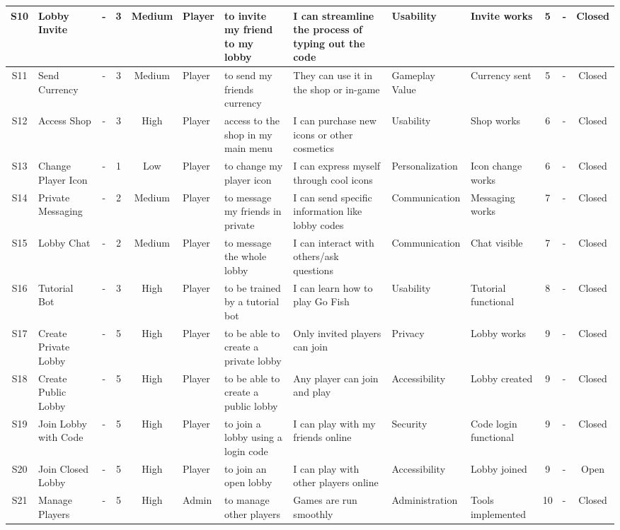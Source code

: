 \documentclass[12pt]{article}
\begin{document}
\begin{table}[H]
{\begin{tabular}{|c|p{2.5cm}|c|c|c|p{3cm}|p{3cm}|p{3cm}|p{3cm}|p{2.5cm}|c|p{2.5cm}|c|}
S10 & Lobby Invite & - & 3 & Medium & Player & to invite my friend to my lobby & I can streamline the process of typing out the code & Usability & Invite works & 5 & - & Closed \\ \hline
S11 & Send Currency & - & 3 & Medium & Player & to send my friends currency & They can use it in the shop or in-game & Gameplay Value & Currency sent & 5 & - & Closed \\ \hline
S12 & Access Shop & - & 3 & High & Player & access to the shop in my main menu & I can purchase new icons or other cosmetics & Usability & Shop works & 6 & - & Closed \\ \hline
S13 & Change Player Icon & - & 1 & Low & Player & to change my player icon & I can express myself through cool icons & Personalization & Icon change works & 6 & - & Closed \\ \hline
S14 & Private Messaging & - & 2 & Medium & Player & to message my friends in private & I can send specific information like lobby codes & Communication & Messaging works & 7 & - & Closed \\ \hline
S15 & Lobby Chat & - & 2 & Medium & Player & to message the whole lobby & I can interact with others/ask questions & Communication & Chat visible & 7 & - & Closed \\ \hline
S16 & Tutorial Bot & - & 3 & High & Player & to be trained by a tutorial bot & I can learn how to play Go Fish & Usability & Tutorial functional & 8 & - & Closed \\ \hline
S17 & Create Private Lobby & - & 5 & High & Player & to be able to create a private lobby & Only invited players can join & Privacy & Lobby works & 9 & - & Closed \\ \hline
S18 & Create Public Lobby & - & 5 & High & Player & to be able to create a public lobby & Any player can join and play & Accessibility & Lobby created & 9 & - & Closed \\ \hline
S19 & Join Lobby with Code & - & 5 & High & Player & to join a lobby using a login code & I can play with my friends online & Security & Code login functional & 9 & - & Closed \\ \hline
S20 & Join Closed Lobby & - & 5 & High & Player & to join an open lobby & I can play with other players online & Accessibility & Lobby joined & 9 & - & Open \\ \hline
S21 & Manage Players & - & 5 & High & Admin & to manage other players & Games are run smoothly & Administration & Tools implemented & 10 & - & Closed \\ \hline

\end{tabular}}
\end{table}
\end{document}
